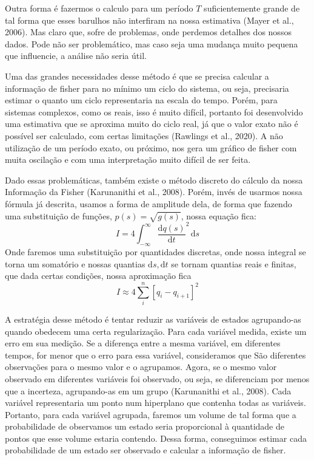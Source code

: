 \documentclass{article}[12pt]
\begin{document}
Outra forma é fazermos o calculo para um período \(T\) suficientemente grande de tal forma que esses
barulhos não interfiram na nossa estimativa (Mayer et al., 2006). Mas claro que, sofre de problemas, onde perdemos
detalhes dos nossos dados. Pode não ser problemático, mas caso seja uma mudança muito pequena que
influencie, a análise não seria útil. \par

Uma das grandes necessidades desse método é que se precisa calcular a informação de fisher para no
mínimo um ciclo do sistema, ou seja, precisaria estimar o quanto um ciclo representaria na escala do
tempo. Porém, para sistemas complexos, como os reais, isso é muito difícil, portanto foi
desenvolvido uma estimativa que se aproxima muito do ciclo real, já que o valor exato não é possível
ser calculado, com certas limitações (Rawlings et al., 2020). A não utilização de um período exato, ou próximo, nos
gera um gráfico de fisher com muita oscilação e com uma interpretação muito difícil de ser
feita.\par

Dado essas problemáticas, também existe o método discreto do cálculo da nossa Informação da Fisher  (Karunanithi
et al., 2008).
Porém, invés de usarmos nossa fórmula já descrita, usamos a forma de amplitude dela, de forma que
fazendo uma substituição de funções, \(p(s)=\sqrt{g(s)} \), nossa equação fica:
\begin{equation}
    I=4\int_{-\infty}^{\infty} \frac{\mathrm{d}q(s)}{\mathrm{d}t} ^{2}  \,\mathrm{d}s 
\end{equation}
Onde faremos uma substituição por quantidades discretas, onde nossa integral se torna um somatório e
nossas quantias \(\mathrm{d}s, \mathrm{d}t \) se tornam quantias reais e finitas, que dada certas
condições, nossa aproximação fica
\begin{equation}
    I \approx 4\sum_{i}^n [q_i - q_{i+1} ]^2
\end{equation} 

A estratégia desse método é tentar reduzir as variáveis de estados agrupando-as quando obedecem uma
certa regularização. Para cada variável medida, existe um erro em sua medição. Se a diferença entre
a mesma variável, em diferentes tempos, for menor que o erro para essa variável, consideramos que
São diferentes observações para o mesmo valor e o agrupamos. Agora, se o mesmo valor observado em
diferentes variáveis foi observado, ou seja, se diferenciam por menos que a incerteza, agrupando-as em
um grupo (Karunanithi
et al., 2008). Cada variável representaria um ponto num hiperplano que contenha todas as variáveis.
Portanto, para cada variável agrupada, faremos um volume de tal forma que a probabilidade de
observamos um estado seria proporcional à quantidade de pontos que esse volume estaria contendo. Dessa
forma, conseguimos estimar cada probabilidade de um estado ser observado e calcular a informação
de fisher. \par
\end{document}
